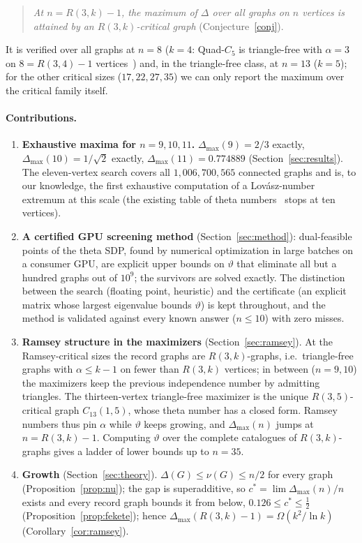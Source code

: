 \documentclass[11pt]{article}
\renewcommand{\theta}{\vartheta}
\newcommand{\gap}{\Delta}
\begin{document}
\begin{quote}
\emph{At $n=R(3,k)-1$, the maximum of $\gap$ over all graphs on $n$ vertices is attained by an $R(3,k)$-critical graph} (Conjecture~\ref{conj}).
\end{quote}
It is verified over all graphs at $n=8$ ($k=4$: Quad-$C_5$ is triangle-free with $\alpha=3$ on $8=R(3,4)-1$ vertices~\cite{tamer2026}) and, in the triangle-free class, at $n=13$ ($k=5$); for the other critical sizes ($17,22,27,35$) we can only report the maximum over the critical family itself.

\paragraph{Contributions.}
\begin{enumerate}
\item \textbf{Exhaustive maxima for $n=9,10,11$.} $\gap_{\max}(9)=2/3$ exactly, $\gap_{\max}(10)=1/\sqrt2$ exactly, $\gap_{\max}(11)=0.774889$ (Section~\ref{sec:results}). The eleven-vertex search covers all $1{,}006{,}700{,}565$ connected graphs and is, to our knowledge, the first exhaustive computation of a Lov\'asz-number extremum at this scale (the existing table of theta numbers~\cite{cabello2013basic,danielsen-db} stops at ten vertices).
\item \textbf{A certified GPU screening method} (Section~\ref{sec:method}): dual-feasible points of the theta SDP, found by numerical optimization in large batches on a consumer GPU, are explicit upper bounds on $\theta$ that eliminate all but a hundred graphs out of $10^9$; the survivors are solved exactly. The distinction between the search (floating point, heuristic) and the certificate (an explicit matrix whose largest eigenvalue bounds $\theta$) is kept throughout, and the method is validated against every known answer ($n\le 10$) with zero misses.
\item \textbf{Ramsey structure in the maximizers} (Section~\ref{sec:ramsey}). At the Ramsey-critical sizes the record graphs are $R(3,k)$-graphs, i.e.\ triangle-free graphs with $\alpha\le k-1$ on fewer than $R(3,k)$ vertices; in between ($n=9,10$) the maximizers keep the previous independence number by admitting triangles. The thirteen-vertex triangle-free maximizer is the unique $R(3,5)$-critical graph $C_{13}(1,5)$, whose theta number has a closed form. Ramsey numbers thus pin $\alpha$ while $\theta$ keeps growing, and $\gap_{\max}(n)$ jumps at $n=R(3,k)-1$. Computing $\theta$ over the complete catalogues of $R(3,k)$-graphs gives a ladder of lower bounds up to $n=35$.
\item \textbf{Growth} (Section~\ref{sec:theory}). $\gap(G)\le\nu(G)\le n/2$ for every graph (Proposition~\ref{prop:nu}); the gap is superadditive, so $c^*=\lim\gap_{\max}(n)/n$ exists and every record graph bounds it from below, $0.126\le c^*\le\tfrac12$ (Proposition~\ref{prop:fekete}); hence $\gap_{\max}(R(3,k)-1)=\Omega(k^2/\ln k)$ (Corollary~\ref{cor:ramsey}).
\end{enumerate}
\end{document}
